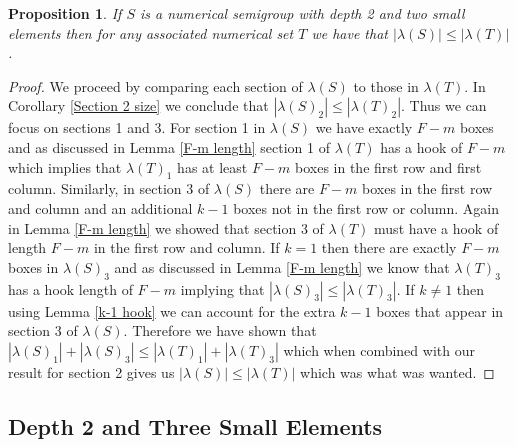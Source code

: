 \documentclass[11pt,letterpaper]{article}
\newtheorem{prop}[thm]{Proposition}
\theoremstyle{definition}
\begin{document}
\begin{prop}
    If $S$ is a numerical semigroup with depth 2 and two small elements then for any associated numerical set $T$ we have that $|\lambda(S)|\leq|\lambda(T)|$.
\end{prop}

\begin{proof}
    We proceed by comparing each section of $\lambda(S)$ to those in $\lambda(T)$. In Corollary \ref{Section 2 size} we conclude that $|\lambda(S)_2|\leq|\lambda(T)_2|$. Thus we can focus on sections 1 and 3. For section 1 in $\lambda(S)$ we have exactly $F-m$ boxes and as discussed in Lemma \ref{F-m length} section 1 of $\lambda(T)$ has a hook of $F-m$ which implies that $\lambda(T)_1$ has at least $F-m$ boxes in the first row and first column. Similarly, in section 3 of $\lambda(S)$ there are $F-m$ boxes in the first row and column and an additional $k-1$ boxes not in the first row or column. Again in Lemma \ref{F-m length} we showed that section 3 of $\lambda(T)$ must have a hook of length $F-m$ in the first row and column. If $k=1$ then there are exactly $F-m$ boxes in $\lambda(S)_3$ and as discussed in Lemma \ref{F-m length} we know that $\lambda(T)_3$ has a hook length of $F-m$ implying that $|\lambda(S)_3|\leq|\lambda(T)_3|$. If $k\neq 1$ then using Lemma \ref{k-1 hook} we can account for the extra $k-1$ boxes that appear in section 3 of $\lambda(S)$. Therefore we have shown that $|\lambda(S)_1|+|\lambda(S)_3|\leq |\lambda(T)_1|+|\lambda(T)_3|$ which when combined with our result for section 2 gives us $|\lambda(S)|\leq |\lambda(T)|$ which was what was wanted.
\end{proof}



\newpage

\begin{center}
    \section{Depth 2 and Three Small Elements}
\end{center}
\end{document}
